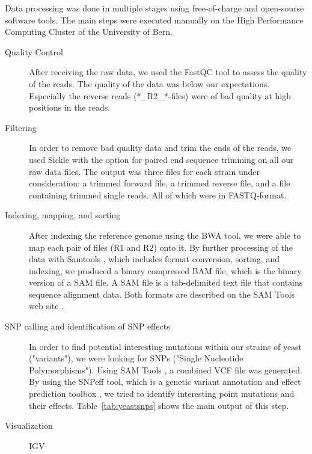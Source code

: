 \documentclass[10pt,a4paper]{article}
\begin{document}
Data processing was done in multiple stages using free-of-charge and open-sourse software tools. The main steps were executed manually on the High Performance Computing Cluster of the University of Bern.

\begin{description}
\item[Quality Control] After receiving the raw data, we used the FastQC \cite{FastQC} tool to assess the quality of the reads. The quality of the data was below our expectations. Especially the reverse reads (*\_R2\_*-files) were of bad quality at high positions in the reads.

\item[Filtering] In order to remove bad quality data and trim the ends of the reads, we used Sickle \cite{sickle} with the option for paired end sequence trimming on all our raw data files. The output was three files for each strain under consideration: a trimmed forward file, a trimmed reverse file, and a file containing trimmed single reads. All of which were in FASTQ-format.

\item[Indexing, mapping, and sorting] After indexing the reference genome using the BWA \cite{BWA} tool, we were able to map each pair of files (R1 and R2) onto it. By further processing of the data with Samtools \cite{SAMtools}, which includes format conversion, sorting, and indexing, we produced a binary compressed BAM file, which is the binary version of a SAM file. A SAM file is a tab-delimited text file that contains sequence alignment data. Both formats are described on the SAM Tools web site \cite{SAMtools}.

\item[SNP calling and identification of SNP effects] In order to find potential interesting mutations within our strains of yeast ("variants"), we were looking for SNPs ("Single Nucleotide Polymorphisms"). Using SAM Tools \cite{SAMtools}, a combined VCF file was generated. By using the SNPeff tool, which is a genetic variant annotation and effect prediction toolbox \cite{cingolani2012program}, we tried to identify interesting point mutations and their effects. Table~\ref*{tab:yeastsnps} shows the main output of this step.

\item[Visualization] IGV


\end{description}
\end{document}
